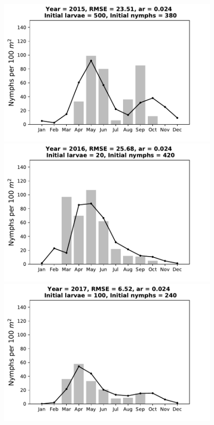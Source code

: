 \documentclass[a4paper, 11pt]{scrartcl}
\begin{document}
\begin{figure}[h!]
\begin{minipage}[c]{0.40\linewidth}
\end{minipage}
\begin{minipage}[c]{0.40\linewidth}
\includegraphics[width=\linewidth]{figures/s4/S4_2015}
\end{minipage}
\begin{minipage}[c]{0.40\linewidth}
\includegraphics[width=\linewidth]{figures/s4/S4_2016}
\end{minipage}
\begin{minipage}[c]{0.40\linewidth}
\includegraphics[width=\linewidth]{figures/s4/S4_2017}

\end{minipage}
\end{figure}
\end{document}
